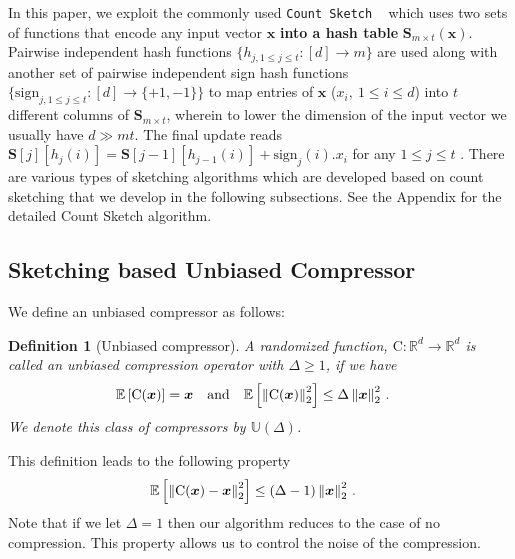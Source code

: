 \documentclass{article}
\newtheorem{definition}{Definition}
\begin{document}
In this paper, we exploit the commonly used \texttt{Count Sketch} ~\citep{DBLP:journals/tcs/CharikarCF04} which uses two sets of functions that encode any input vector $\boldsymbol{x}$ \textbf{into a hash table} $\boldsymbol{S}_{m\times t}(\boldsymbol{x})$. 
Pairwise independent hash functions $\{h_{j,1\leq j\leq t }:[d]\rightarrow m\}$ are used along with another set of pairwise independent sign hash functions $\{\text{sign}_{j,1\leq j\leq t}: [d]\rightarrow \{+1,-1\}\}$ to map entries of $\boldsymbol{x}$ (${x}_i, \:1\leq i\leq d$) into $t$ different columns of $\mathbf{S}_{m\times t}$, wherein to lower the dimension of the input vector we usually have $d\gg mt$.  
The final update reads $\mathbf{S}[j][h_j(i)]=\mathbf{S}[j-1][h_{j-1}(i)]+\text{sign}_j(i).{x}_i$ for any $1 \leq j \leq t$ .
There are various types of sketching algorithms which are developed based on count sketching that we develop in the following subsections. 
See the Appendix for the detailed Count Sketch algorithm. 




\vspace{-0.05in}
\subsection{Sketching based Unbiased Compressor}
\vspace{-0.05in}



We define an unbiased compressor as follows:
\begin{definition}[Unbiased compressor]\label{def:unbiased}
A randomized function, $\text{C}:\mathbb{R}^{d}\rightarrow\mathbb{R}^{d}$ is called an unbiased compression operator with $\Delta\geq 1$, if we have 
\begin{align}\notag
\mathbb{E}\left[\text{C}(\boldsymbol{x})\right]&=\boldsymbol{x}\nonumber \quad \textrm{and} \quad    \mathbb{E}\left[\left\|\text{C}(\boldsymbol{x})\right\|^2_2\right] \leq \Delta\left\|\boldsymbol{x}\right\|^2_2\notag \, .
\end{align}
We denote this class of compressors by $\mathbb{U}(\Delta)$.
\end{definition}
This definition leads to the following property 
\begin{align}\notag
    \mathbb{E}\left[\left\|\text{C}(\boldsymbol{x})-\boldsymbol{x}\right\|^2_2\right]&\leq \left(\Delta-1\right)\left\|\boldsymbol{x}\right\|^2_2\, .
\end{align}
Note that if we let $\Delta=1$ then our algorithm reduces to the case of no compression. 
This property allows us to control the noise of the compression.
\end{document}
